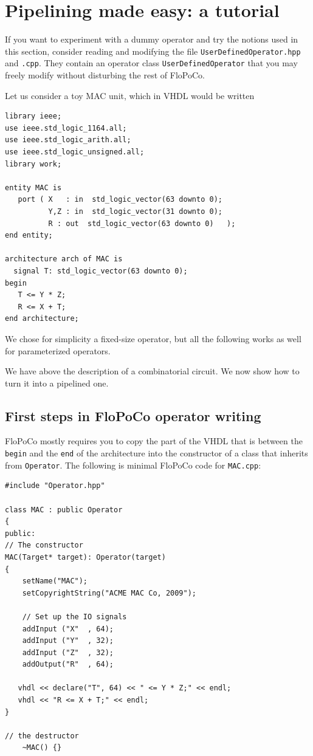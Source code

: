 \documentclass{article}
\begin{document}
\section{Pipelining made easy: a tutorial \label{sec:pipeline-made-easy}}
\label{sec:pme}


If you want to experiment with a dummy operator and try the notions
used in this section, consider reading and modifying the file
\texttt{UserDefinedOperator.hpp} and \texttt{.cpp}. They contain an
operator class \texttt{UserDefinedOperator} that you may freely modify
without disturbing the rest of FloPoCo.


Let us consider a toy MAC unit, which in VHDL would be written
\begin{verbatim}
library ieee;
use ieee.std_logic_1164.all;
use ieee.std_logic_arith.all;
use ieee.std_logic_unsigned.all;
library work;

entity MAC is
   port ( X   : in  std_logic_vector(63 downto 0);
          Y,Z : in  std_logic_vector(31 downto 0);
          R : out  std_logic_vector(63 downto 0)   );
end entity;

architecture arch of MAC is
  signal T: std_logic_vector(63 downto 0);
begin
   T <= Y * Z;
   R <= X + T;
end architecture;
\end{verbatim}

We chose for simplicity a fixed-size operator, but all the following
works as well for parameterized operators.

We have above the description of a combinatorial circuit. We now show how to
turn it into a pipelined one.


\subsection{First steps in FloPoCo operator writing}

FloPoCo mostly requires you to copy the part of the VHDL that is
between the \texttt{begin} and the \texttt{end} of the architecture
into the constructor of a class that inherits from
\verb!Operator!. The following is minimal FloPoCo code for
\verb!MAC.cpp!:
\begin{verbatim}
#include "Operator.hpp"

class MAC : public Operator
{
public:
// The constructor
MAC(Target* target): Operator(target)
{
	setName("MAC");
	setCopyrightString("ACME MAC Co, 2009");		

	// Set up the IO signals
	addInput ("X"  , 64);
	addInput ("Y"  , 32);
	addInput ("Z"  , 32);
	addOutput("R"  , 64);

   vhdl << declare("T", 64) << " <= Y * Z;" << endl;
   vhdl << "R <= X + T;" << endl;
}

// the destructor
	~MAC() {}
\end{verbatim}
 
\end{document}
